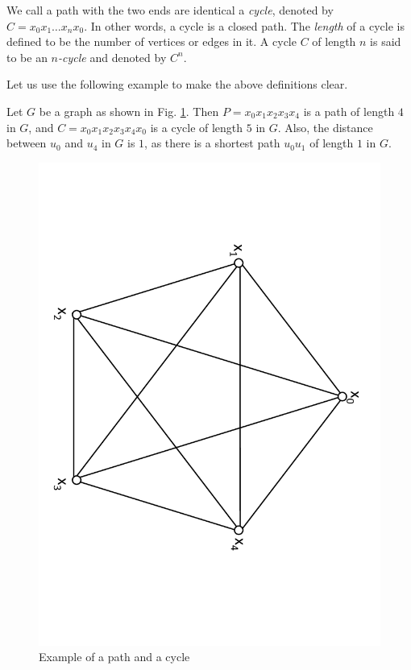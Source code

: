 We call a path with the two ends are identical a \textit{cycle}, denoted by $C = x_0x_1\dots x_nx_0$. In other words, a cycle is a closed path. The \emph{length} of a cycle is defined to be the number of vertices or edges in it. A cycle $C$ of length $n$ is said to be an {\it{$n$-cycle}} and denoted by $C^n$.

Let us use the following example to make the above definitions clear. 

\begin{example}
Let $G$ be a graph as shown in Fig. \ref{path and cycle}. Then $P = x_0x_1x_2x_3x_4$ is a path of length $4$ in $G$, and $C =  x_0x_1x_2x_3x_4x_0$ is a cycle of length $5$ in $G$. Also, the distance between $u_0$ and $u_4$ in $G$ is $1$, as there is a shortest path $u_0u_1$ of length $1$ in $G$. 

\begin{figure}
  \centering
      \vspace{-10pt}
    \includegraphics[scale=0.25, angle=90]{../figures/fig2-2.pdf}
        \vspace{5pt}
  \caption{Example of a path and a cycle}
  \label{path and cycle}
\end{figure}

\end{example}

